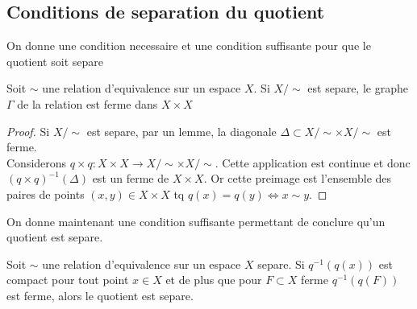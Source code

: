 \documentclass[../main.tex]{subfiles}
\begin{document}
\subsection{Conditions de separation du quotient}
On donne une condition necessaire et une condition suffisante pour que le quotient soit separe
\begin{propo}
Soit $\sim$ une relation d'equivalence sur un espace $X$. Si $ X /\sim$ est separe, le graphe $\Gamma$  de la relation est ferme dans $X\times X$ 
\end{propo}
\begin{proof}
Si $X /\sim$ est separe, par un lemme, la diagonale $\Delta \subset X /\sim\times X/\sim$ est ferme.\\
Considerons $q \times q : X\times X \to X /\sim \times X /\sim$. Cette application est continue et donc $( q\times q)^{-1}( \Delta) $ est un ferme de $X \times X$. Or cette preimage est l'ensemble des paires de points $( x,y)\in X\times X $ tq $q( x) = q( y) \iff x\sim y$.
\end{proof}
On donne maintenant une condition suffisante permettant de conclure qu'un quotient est separe.
\begin{propo}
Soit $\sim$ une relation d'equivalence sur un espace $X$ separe. Si $q^{-1}( q( x) ) $ est compact pour tout point $x\in X$ et de plus que pour $F \subset X$ ferme $q^{-1}( q( F) ) $ est ferme, alors le quotient est separe.
\end{propo}
\end{document}
